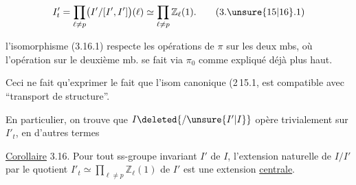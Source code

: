 \[
 I'_t=\prod_{\ell\ne p}\bigl(I'/[I',I']\bigr)(\ell)\simeq\prod_{\ell\ne p}\mathbb Z_\ell(1). \tag*{(3.\unsure{15|16}.1)}
\]

 

 l'isomorphisme  (3.16.1) respecte les opérations de \(\pi\) sur les deux mbs, où l'opération sur le deuxième mb.  se fait via \(\pi_0\) comme expliqué déjà plus haut.

Ceci ne fait qu'exprimer le fait que l'isom canonique (2\,15.1, est compatible avec ``transport de structure''.

En particulier, on trouve que \(I\deleted{/\unsure{I'|I}}\) opère trivialement sur \(I'_t\), en d'autres termes

\uline{Corollaire} 3.16. Pour tout ss-groupe  invariant \(I'\)  de \(I\), l'extension naturelle de \(I/I'\) par le quotient \(I'_t\simeq\prod_{\ell\ne p}\mathbb Z_\ell(1)\) de \(I'\) est une extension \uline{centrale}.

